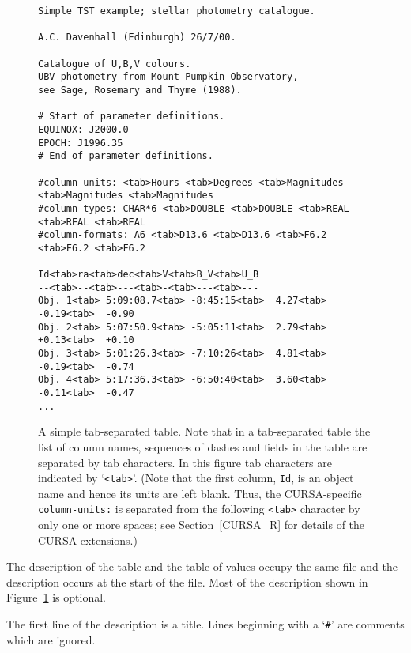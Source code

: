 \documentclass[twoside,11pt]{article}
\renewcommand{\_}{\texttt{\symbol{95}}}
\begin{document}
\begin{figure}[htbp]


\begin{verbatim}
Simple TST example; stellar photometry catalogue.

A.C. Davenhall (Edinburgh) 26/7/00.

Catalogue of U,B,V colours.
UBV photometry from Mount Pumpkin Observatory,
see Sage, Rosemary and Thyme (1988).

# Start of parameter definitions.
EQUINOX: J2000.0
EPOCH: J1996.35
# End of parameter definitions.

#column-units: <tab>Hours <tab>Degrees <tab>Magnitudes <tab>Magnitudes <tab>Magnitudes
#column-types: CHAR*6 <tab>DOUBLE <tab>DOUBLE <tab>REAL <tab>REAL <tab>REAL
#column-formats: A6 <tab>D13.6 <tab>D13.6 <tab>F6.2 <tab>F6.2 <tab>F6.2

Id<tab>ra<tab>dec<tab>V<tab>B_V<tab>U_B
--<tab>--<tab>---<tab>-<tab>---<tab>---
Obj. 1<tab> 5:09:08.7<tab> -8:45:15<tab>  4.27<tab>  -0.19<tab>  -0.90
Obj. 2<tab> 5:07:50.9<tab> -5:05:11<tab>  2.79<tab>  +0.13<tab>  +0.10
Obj. 3<tab> 5:01:26.3<tab> -7:10:26<tab>  4.81<tab>  -0.19<tab>  -0.74
Obj. 4<tab> 5:17:36.3<tab> -6:50:40<tab>  3.60<tab>  -0.11<tab>  -0.47
...
\end{verbatim}

\begin{quote}
\caption[A simple tab-separated table.]{A simple tab-separated table.
Note that in a tab-separated table the list of column names, sequences of
dashes and fields in the table are separated by tab characters.  In this
figure tab characters are indicated by `{\tt <tab>}'.  (Note that the
first column, {\tt Id}, is an object name and hence its units are left
blank.  Thus, the CURSA-specific {\tt column-units:} is separated from
the following {\tt <tab>} character by only one or more spaces; see
Section~\ref{CURSA_R} for details of the CURSA extensions.)
\label{TSTEXAMP} }
\end{quote}

\end{figure}

The description of the table and the table of values occupy the same
file and the description occurs at the start of the file.  Most of the
description shown in Figure~\ref{TSTEXAMP} is optional.

The first line of the description is a title.  Lines beginning with a
`{\tt \#}' are comments which are ignored.
\end{document}
